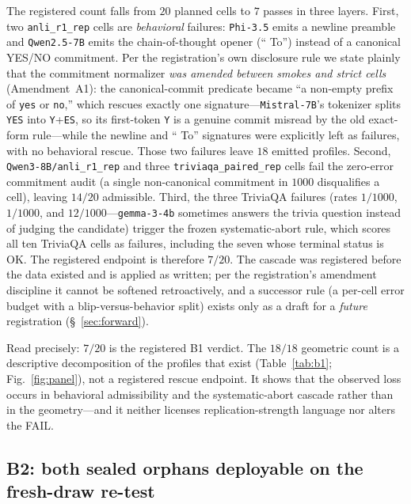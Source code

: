 \documentclass[11pt]{article}
\begin{document}
The registered count falls from $20$ planned cells to $7$ passes in three layers. First, two
\texttt{anli\_r1\_rep} cells are \emph{behavioral} failures: \texttt{Phi-3.5} emits a newline
preamble and \texttt{Qwen2.5-7B} emits the chain-of-thought opener (`` To'') instead of a
canonical YES/NO commitment. Per the registration's own disclosure rule we state plainly that the
commitment normalizer \emph{was amended between smokes and strict cells} (Amendment~A1): the
canonical-commit predicate became ``a non-empty prefix of \texttt{yes} or \texttt{no},'' which
rescues exactly one signature---\texttt{Mistral-7B}'s tokenizer splits \texttt{YES} into
\texttt{Y}+\texttt{ES}, so its first-token \texttt{Y} is a genuine commit misread by the old
exact-form rule---while the newline and `` To'' signatures were explicitly left as failures, with
no behavioral rescue. Those two failures leave $18$ emitted profiles. Second,
\texttt{Qwen3-8B/anli\_r1\_rep} and three \texttt{triviaqa\_paired\_rep} cells fail the
zero-error commitment audit (a single non-canonical commitment in $1000$ disqualifies a cell),
leaving $14/20$ admissible. Third, the three TriviaQA failures (rates $1/1000$, $1/1000$, and
$12/1000$---\texttt{gemma-3-4b} sometimes answers the trivia question instead of judging the
candidate) trigger the frozen systematic-abort rule, which scores all ten TriviaQA cells as
failures, including the seven whose terminal status is OK. The registered endpoint is therefore
$7/20$. The cascade was registered before the data existed and is applied as written; per the
registration's amendment discipline it cannot be softened retroactively, and a successor rule (a
per-cell error budget with a blip-versus-behavior split) exists only as a draft for a
\emph{future} registration (\S~\ref{sec:forward}).

Read precisely: $7/20$ is the registered B1 verdict. The $18/18$ geometric count is a descriptive
decomposition of the profiles that exist (Table~\ref{tab:b1}; Fig.~\ref{fig:panel}), not a
registered rescue endpoint. It shows that the observed loss occurs in behavioral admissibility
and the systematic-abort cascade rather than in the geometry---and it neither licenses
replication-strength language nor alters the FAIL.

\subsection{B2: both sealed orphans deployable on the fresh-draw re-test}
\end{document}
